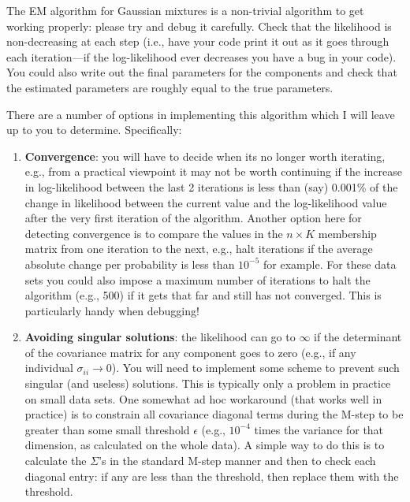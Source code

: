 \documentclass[11pt,psfig]{article}
\begin{document}
The EM algorithm for Gaussian mixtures is a non-trivial algorithm to get working properly: please try and debug
it carefully. Check that the likelihood is non-decreasing at each step (i.e.,
have your code print it out as it goes through each iteration---if the
log-likelihood ever decreases you have a bug in your code). You could also
 write out the final parameters for the components and check that
the estimated parameters are roughly equal to the true parameters. 



There are a number of options in implementing this algorithm
which I will leave up to you to determine. Specifically:
\begin{enumerate}
\item {\bf Convergence}: you will have to decide when its no longer worth iterating,
e.g., from a practical viewpoint it may not be worth continuing if the increase
in log-likelihood between the last 2 iterations is less than (say) 0.001\% of
the change in likelihood between the current value and the log-likelihood value
after the very first iteration of the algorithm. Another option here for detecting convergence is to compare the values in the $n \times K$ membership matrix from one iteration to the next, e.g., halt iterations if the average absolute change per probability is less than $10^{-5}$ for example.
For these data sets you could
also impose a maximum number of iterations to halt the algorithm (e.g.,  
500) if it gets that far and still has not converged. This is particularly
handy when debugging! 

\item {\bf Avoiding singular solutions}: the likelihood can go to
$\infty$ if the determinant of the covariance matrix for any component goes to zero (e.g., if any
individual $\sigma_{ii} \to 0$). You will need to implement some scheme to prevent
such singular (and useless) solutions. This is typically only a problem in
practice on small data sets. One somewhat ad hoc workaround (that works well in
practice)   is to constrain all covariance diagonal terms during the M-step to
be greater than some small threshold $\epsilon$ (e.g., $10^{-4}$ times the
variance for that dimension, as calculated on the whole data). A simple way to
do this is to calculate the $\Sigma$'s in the standard M-step manner  and then
to check each diagonal entry: if any are less than the threshold, then replace
them with the threshold. 
\end{enumerate}
\end{document}
